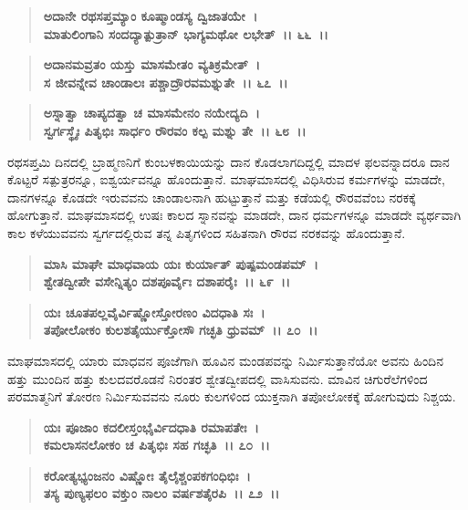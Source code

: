 \begin{verse}
\textbf{ಅದಾನೇ ರಥಸಪ್ತಮ್ಯಾಂ ಕೂಷ್ಮಾಂಡಸ್ಯ ದ್ವಿಜಾತಯೇ~।}\\\textbf{ಮಾತುಲಿಂಗಾನಿ ಸಂದದ್ಯಾತ್ಪುತ್ರಾನ್ ಭಾಗ್ಯಮಥೋ ಲಭೇತ್~।। ೬೬~।।} 
\end{verse}

\begin{verse}
\textbf{ಅದಾನಮವ್ರತಂ ಯಸ್ತು ಮಾಸಮೇತಂ ವ್ಯತಿಕ್ರಮೇತ್~।}\\\textbf{ಸ ಜೀವನ್ನೇವ ಚಾಂಡಾಲಃ ಪಶ್ಚಾದ್ರೌರವಮಶ್ನುತೇ~।। ೬೭~।। }
\end{verse}

\begin{verse}
\textbf{ಅಸ್ನಾತ್ವಾ ಚಾಪ್ಯದತ್ವಾ ಚ ಮಾಸಮೇನಂ ನಯೇದ್ಯದಿ~।}\\\textbf{ಸ್ವರ್ಗಸ್ಥೈಃ ಪಿತೃಭಿಃ ಸಾರ್ಧಂ ರೌರವಂ ಕಲ್ಪ ಮಶ್ನು ತೇ~।। ೬೮~।।}
\end{verse}

ರಥಸಪ್ತಮಿ ದಿನದಲ್ಲಿ ಬ್ರಾಹ್ಮಣನಿಗೆ ಕುಂಬಳಕಾಯಿಯನ್ನು ದಾನ ಕೊಡಲಾಗದಿದ್ದಲ್ಲಿ ಮಾದಳ ಫಲವನ್ನಾದರೂ ದಾನ ಕೊಟ್ಟರೆ ಸತ್ಪುತ್ರರನ್ನೂ, ಐಶ್ವರ್ಯವನ್ನೂ ಹೊಂದುತ್ತಾನೆ. ಮಾಘಮಾಸದಲ್ಲಿ ವಿಧಿಸಿರುವ ಕರ್ಮಗಳನ್ನು ಮಾಡದೇ, ದಾನಗಳನ್ನೂ ಕೊಡದೇ ಇರುವವನು ಚಾಂಡಾಲನಾಗಿ ಹುಟ್ಟುತ್ತಾನೆ ಮತ್ತು ಕಡೆಯಲ್ಲಿ ರೌರವವೆಂಬ ನರಕಕ್ಕೆ ಹೋಗುತ್ತಾನೆ. ಮಾಘಮಾಸದಲ್ಲಿ ಉಷಃ ಕಾಲದ ಸ್ನಾನವನ್ನು ಮಾಡದೇ, ದಾನ ಧರ್ಮಗಳನ್ನೂ ಮಾಡದೇ ವ್ಯರ್ಥವಾಗಿ ಕಾಲ ಕಳೆಯುವವನು ಸ್ವರ್ಗದಲ್ಲಿರುವ ತನ್ನ ಪಿತೃಗಳಿಂದ ಸಹಿತನಾಗಿ ರೌರವ ನರಕವನ್ನು ಹೊಂದುತ್ತಾನೆ.

\begin{verse}
\textbf{ಮಾಸಿ ಮಾಘೇ ಮಾಧವಾಯ ಯಃ ಕುರ್ಯಾತ್ ಪುಷ್ಪಮಂಡಪಮ್~।}\\\textbf{ಶ್ವೇತದ್ವೀಪೇ ವಸೇನ್ನಿತ್ಯಂ ದಶಪೂರ್ವೈಃ ದಶಾಪರೈಃ~।। ೬೯~।।}
\end{verse}

\begin{verse}
\textbf{ಯಃ ಚೂತಪಲ್ಲವೈರ್ವಿಷ್ಣೋಸ್ತೋರಣಂ ವಿದಧಾತಿ ಸಃ~।}\\\textbf{ತಪೋಲೋಕಂ ಕುಲಶತೈರ್ಯುಕ್ತೋಸೌ ಗಚ್ಛತಿ ಧ್ರುವಮ್~।। ೭೦~।।}
\end{verse}

ಮಾಘಮಾಸದಲ್ಲಿ ಯಾರು ಮಾಧವನ ಪೂಜೆಗಾಗಿ ಹೂವಿನ ಮಂಡಪವನ್ನು ನಿರ್ಮಿಸುತ್ತಾನೆಯೋ ಅವನು ಹಿಂದಿನ ಹತ್ತು ಮುಂದಿನ ಹತ್ತು ಕುಲದವರೊಡನೆ ನಿರಂತರ ಶ್ವೇತದ್ವೀಪದಲ್ಲಿ ವಾಸಿಸುವನು. ಮಾವಿನ ಚಿಗುರೆಲೆಗಳಿಂದ ಪರಮಾತ್ಮನಿಗೆ ತೋರಣ ನಿರ್ಮಿಸುವವನು ನೂರು ಕುಲಗಳಿಂದ ಯುಕ್ತನಾಗಿ ತಪೋಲೋಕಕ್ಕೆ ಹೋಗುವುದು ನಿಶ್ಚಯ.

\begin{verse}
\textbf{ಯಃ ಪೂಜಾಂ ಕದಲೀಸ್ತಂಭೈರ್ವಿದಧಾತಿ ರಮಾಪತೇಃ~।}\\\textbf{ಕಮಲಾಸನಲೋಕಂ ಚ ಪಿತೃಭಿಃ ಸಹ ಗಚ್ಛತಿ~।। ೭೦~।। }
\end{verse}

\begin{verse}
\textbf{ಕರೋತ್ಯಭ್ಯಂಜನಂ ವಿಷ್ಣೋಃ ತೈಲೈಶ್ಚಂಪಕಗಂಧಿಭಿಃ~।}\\\textbf{ತಸ್ಯ ಪುಣ್ಯಫಲಂ ವಕ್ತುಂ ನಾಲಂ ವರ್ಷಶತೈರಪಿ~।। ೭೨~।।}
\end{verse}

